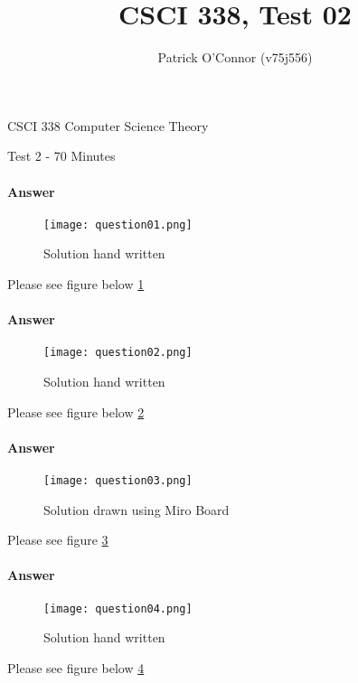 \documentclass{article}
\title{CSCI 338, Test 02}
\author{Patrick O'Connor (v75j556)}
\begin{document}
\maketitle

CSCI 338 Computer Science Theory

Test 2 - 70 Minutes


\paragraph{Answer}

\begin{figure}
    \texttt{[image: question01.png]}
    \caption{Solution hand written}
    \label{fig:num01}
\end{figure}
Please see figure below \ref{fig:num01}


\paragraph{Answer}
\begin{figure}
    \texttt{[image: question02.png]}
    \caption{Solution hand written}
    \label{fig:num02}
\end{figure}
Please see figure below \ref{fig:num02}


\paragraph{Answer}


\begin{figure}
    \texttt{[image: question03.png]}
    \caption{Solution drawn using Miro Board}
    \label{fig:num03}
\end{figure}
Please see figure \ref{fig:num03}



\paragraph{Answer}
\begin{figure}
    \texttt{[image: question04.png]}
    \caption{Solution hand written}
    \label{fig:num04}
\end{figure}
Please see figure below \ref{fig:num04}
\end{document}
